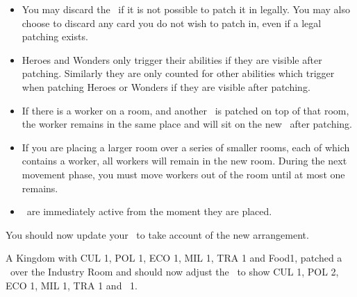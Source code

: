 \documentclass[10pt,twocolumn]{article}
\begin{document}
\begin{itemize}
\item You may discard the \landcard\ if it is not possible to patch it in legally. You may also choose to discard any card you do not wish to patch in, even if a legal patching exists.
\item Heroes and Wonders only trigger their abilities if they are visible after patching. Similarly they are only counted for other abilities which trigger when patching Heroes or Wonders if they are visible after patching.
\item If there is a worker on a room, and another \landcard\ is patched on top of that room, the worker remains in the same place and will sit on the new \landcard\ after patching.
\item If you are placing a larger room over a series of smaller rooms, each of which contains a worker, all workers will remain in the new room. During the next movement phase, you must move workers out of the room until at most one remains.
\item \landcards\ are immediately active from the moment they are placed.
\end{itemize}
You should now update your \psb\ to take account of the new arrangement.
\begin{BoxExample}
A Kingdom with CUL 1, POL 1, ECO 1, MIL 1, TRA 1 and Food1, patched a \landcard\ over the Industry Room and should now adjust the \psb\ to show CUL 1, POL 2, ECO 1, MIL 1, TRA 1 and \minerals\ 1.
\end{BoxExample}
\end{document}
